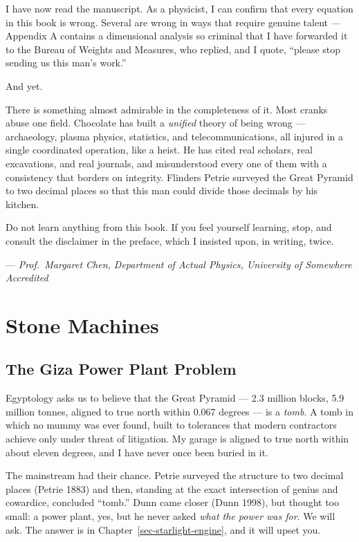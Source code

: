 \documentclass[
  english,
  11pt,
  letterpaper,
]{scrbook}
\begin{document}
I have now read the manuscript. As a physicist, I can confirm that every
equation in this book is wrong. Several are wrong in ways that require
genuine talent --- Appendix A contains a dimensional analysis so
criminal that I have forwarded it to the Bureau of Weights and Measures,
who replied, and I quote, ``please stop sending us this man's work.''

And yet.

There is something almost admirable in the completeness of it. Most
cranks abuse one field. Chocolate has built a \emph{unified} theory of
being wrong --- archaeology, plasma physics, statistics, and
telecommunications, all injured in a single coordinated operation, like
a heist. He has cited real scholars, real excavations, and real
journals, and misunderstood every one of them with a consistency that
borders on integrity. Flinders Petrie surveyed the Great Pyramid to two
decimal places so that this man could divide those decimals by his
kitchen.

Do not learn anything from this book. If you feel yourself learning,
stop, and consult the disclaimer in the preface, which I insisted upon,
in writing, twice.

--- \emph{Prof.~Margaret Chen, Department of Actual Physics, University
of Somewhere Accredited}

\part{Stone Machines}

\chapter{The Giza Power Plant Problem}\label{sec-giza}

Egyptology asks us to believe that the Great
Pyramid --- 2.3 million blocks, 5.9 million tonnes,
aligned to true north within 0.067 degrees --- is a \emph{tomb}. A tomb
in which no mummy was ever found, built to tolerances that modern
contractors achieve only under threat of litigation. My garage is
aligned to true north within about eleven degrees, and I have never once
been buried in it.

The mainstream had their chance. Petrie surveyed the structure to two
decimal places (Petrie 1883) and then, standing at the exact
intersection of genius and cowardice, concluded ``tomb.'' Dunn came
closer (Dunn 1998), but thought too small: a power plant, yes, but he
never asked \emph{what the power was for}. We will ask. The answer is in
Chapter~\ref{sec-starlight-engine}, and it will upset you.
\end{document}

